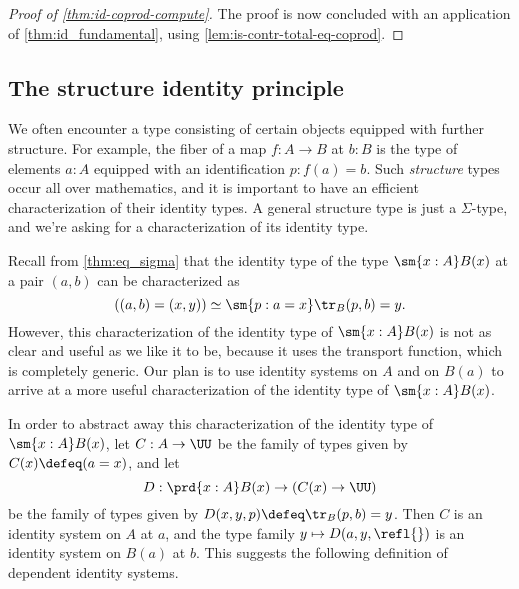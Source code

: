 \begin{proof}[Proof of \cref{thm:id-coprod-compute}]
  The proof is now concluded with an application of \cref{thm:id_fundamental}, using \cref{lem:is-contr-total-eq-coprod}.
\end{proof}

\subsection{The structure identity principle}\label{sec:structure-identity-principle}

We often encounter a type consisting of certain objects equipped with further structure. For example, the fiber of a map $f:A\to B$ at $b:B$ is the type of elements $a:A$ equipped with an identification $p:f(a)=b$. Such \emph{structure} types occur all over mathematics, and it is important to have an efficient characterization of their identity types. A general structure type is just a $\Sigma$-type, and we're asking for a characterization of its identity type.

Recall from \cref{thm:eq_sigma} that the identity type of the type $\sm{x:A}B(x)$ at a pair $(a,b)$ can be characterized as
\begin{equation*}
  ((a,b)=(x,y))\simeq \sm{p:a=x}\tr_B(p,b)=y.
\end{equation*}
However, this characterization of the identity type of $\sm{x:A}B(x)$ is not as clear and useful as we like it to be, because it uses the transport function, which is completely generic. Our plan is to use identity systems on $A$ and on $B(a)$ to arrive at a more useful characterization of the identity type of $\sm{x:A}B(x)$.

In order to abstract away this characterization of the identity type of $\sm{x:A}B(x)$, let $C:A\to\UU$ be the family of types given by $C(x)\defeq (a=x)$, and let
\begin{equation*}
  D:\prd{x:A}B(x)\to(C(x)\to\UU)
\end{equation*}
be the family of types given by $D(x,y,p)\defeq \tr_B(p,b)=y$. Then $C$ is an identity system on $A$ at $a$, and the type family $y\mapsto D(a,y,\refl{})$ is an identity system on $B(a)$ at $b$. This suggests the following definition of dependent identity systems.

